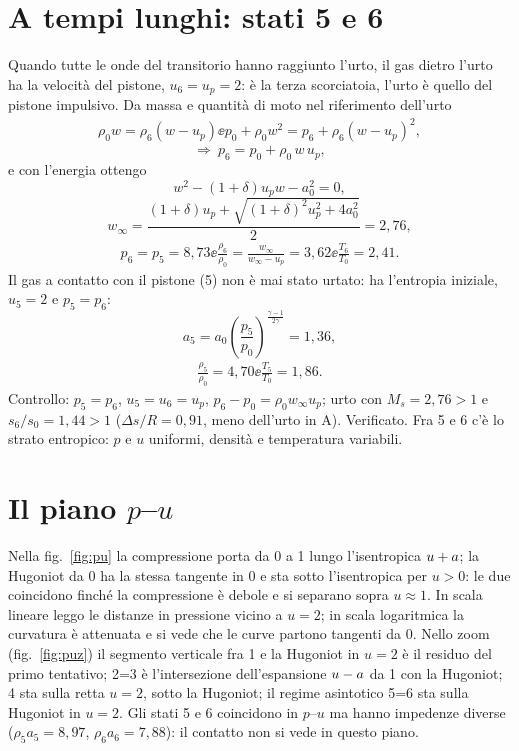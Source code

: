 \section*{A tempi lunghi: stati 5 e 6}
Quando tutte le onde del transitorio hanno raggiunto l'urto, il gas dietro l'urto ha la velocità del pistone,
$u_6=u_p=2$: è la terza scorciatoia, l'urto è quello del pistone impulsivo. Da massa e quantità di moto nel
riferimento dell'urto
\begin{gather*}
\rho_0w=\rho_6(w-u_p) \ee p_0+\rho_0w^2=p_6+\rho_6(w-u_p)^2,
\end{gather*}
\[
\Rightarrow\ p_6=p_0+\rho_0\,w\,u_p,
\]
e con l'energia ottengo
\[
w^2-(1+\delta)u_pw-a_0^2=0,
\]
\[
w_\infty=\frac{(1+\delta)u_p+\sqrt{(1+\delta)^2u_p^2+4a_0^2}}{2}=2{,}76,
\]
\begin{gather*}
p_6=p_5=8{,}73 \ee \frac{\rho_6}{\rho_0}=\frac{w_\infty}{w_\infty-u_p}=3{,}62 \ee \frac{T_6}{T_0}=2{,}41.
\end{gather*}
Il gas a contatto con il pistone (5) non è mai stato urtato: ha l'entropia iniziale, $u_5=2$ e $p_5=p_6$:
\[
a_5=a_0\left(\frac{p_5}{p_0}\right)^{\frac{\gamma-1}{2\gamma}}=1{,}36,
\]
\begin{gather*}
\frac{\rho_5}{\rho_0}=4{,}70 \ee \frac{T_5}{T_0}=1{,}86.
\end{gather*}
Controllo: $p_5=p_6$, $u_5=u_6=u_p$, $p_6-p_0=\rho_0w_\infty u_p$; urto con $M_s=2{,}76>1$ e $s_6/s_0=1{,}44>1$
($\Delta s/R=0{,}91$, meno dell'urto in A). Verificato. Fra 5 e 6 c'è lo strato entropico: $p$ e $u$ uniformi,
densità e temperatura variabili.

\section*{Il piano $p$--$u$}


Nella fig.~\ref{fig:pu} la compressione porta da 0 a 1 lungo l'isentropica $u+a$; la Hugoniot da 0 ha la stessa
tangente in 0 e sta sotto l'isentropica per $u>0$: le due coincidono finché la compressione è debole e si separano
sopra $u\approx1$. In scala lineare leggo le distanze in pressione vicino a $u=2$; in scala logaritmica la curvatura
è attenuata e si vede che le curve partono tangenti da 0. Nello zoom (fig.~\ref{fig:puz}) il segmento verticale fra 1
e la Hugoniot in $u=2$ è il residuo del primo tentativo; 2=3 è l'intersezione dell'espansione $u-a$ da 1 con la
Hugoniot; 4 sta sulla retta $u=2$, sotto la Hugoniot; il regime asintotico 5=6 sta sulla Hugoniot in $u=2$. Gli stati
5 e 6 coincidono in $p$--$u$ ma hanno impedenze diverse ($\rho_5a_5=8{,}97$, $\rho_6a_6=7{,}88$): il contatto non si
vede in questo piano.

